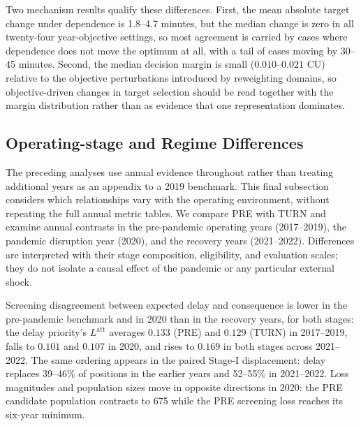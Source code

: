 Two mechanism results qualify these differences. First, the mean absolute target change under dependence is 1.8--4.7 minutes, but the median change is zero in all twenty-four year-objective settings, so most agreement is carried by cases where dependence does not move the optimum at all, with a tail of cases moving by 30--45 minutes. Second, the median decision margin is small ($0.010$--$0.021$ CU) relative to the objective perturbations introduced by reweighting domains, so objective-driven changes in target selection should be read together with the margin distribution rather than as evidence that one representation dominates.

\subsection{Operating-stage and Regime Differences}
\label{subsec:results_heterogeneity}

The preceding analyses use annual evidence throughout rather than treating additional years as an appendix to a 2019 benchmark. This final subsection considers which relationships vary with the operating environment, without repeating the full annual metric tables. We compare PRE with TURN and examine annual contrasts in the pre-pandemic operating years (2017--2019), the pandemic disruption year (2020), and the recovery years (2021--2022). Differences are interpreted with their stage composition, eligibility, and evaluation scales; they do not isolate a causal effect of the pandemic or any particular external shock.

Screening disagreement between expected delay and consequence is lower in the pre-pandemic benchmark and in 2020 than in the recovery years, for both stages: the delay priority's $L^{\mathrm{att}}$ averages $0.133$ (PRE) and $0.129$ (TURN) in 2017--2019, falls to $0.101$ and $0.107$ in 2020, and rises to $0.169$ in both stages across 2021--2022. The same ordering appears in the paired Stage-I displacement: delay replaces 39--46\% of positions in the earlier years and 52--55\% in 2021--2022. Loss magnitudes and population sizes move in opposite directions in 2020: the PRE candidate population contracts to 675 while the PRE screening loss reaches its six-year minimum.

